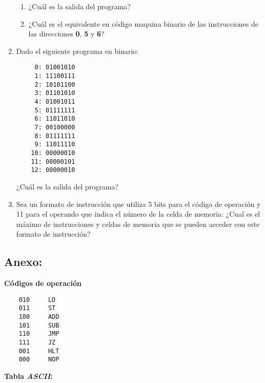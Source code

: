 \documentclass[12pt]{article}
\begin{document}
\begin{enumerate}
\begin{enumerate}
            \item ¿Cuál es la salida del programa?

            \item ¿Cuál es el equivalente en código maquina binario de las
                instrucciones de las direcciones \textbf{0}, \textbf{5} y
                \textbf{6}?

        \end{enumerate}

    \item Dado el siguiente programa en binario:

        \begin{verbatim}
     0: 01001010
     1: 11100111
     2: 10101100
     3: 01101010
     4: 01001011
     5: 01111111
     6: 11011010
     7: 00100000
     8: 01111111
     9: 11011110
    10: 00000010
    11: 00000101
    12: 00000010
        \end{verbatim}

        ¿Cuál es la salida del programa?

    \item Sea un formato de instrucción que utiliza 5 bits para el código de
        operación y 11 para el operando que indica el número de la celda de
        memoria: ¿Cual es el máximo de instrucciones y celdas de memoria que
        se pueden acceder con este formato de instrucción?

\end{enumerate}

\subsection*{ \large\textbf{Anexo:} }

\textbf{Códigos de operación}

\begin{verbatim}
    010     LD
    011     ST
    100     ADD
    101     SUB
    110     JMP
    111     JZ
    001     HLT
    000     NOP
\end{verbatim}

\textbf{Tabla \emph{ASCII}:}
\end{document}
